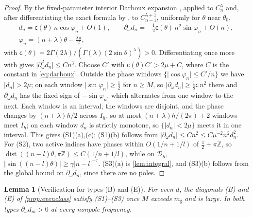 \documentclass[11pt]{amsart}
\numberwithin{equation}{section}
\newtheorem{lemma}[theorem]{Lemma}
\theoremstyle{definition}
\theoremstyle{remark}
\newcommand{\Z}{\mathbb{Z}}
\newcommand{\abs}[1]{\lvert #1\rvert}
\newcommand{\dist}{\operatorname{dist}}
\newcommand{\Dh}{\mathcal D_h}
\begin{document}
\begin{proof}
By the fixed-parameter interior Darboux expansion \cite[(18.15.4\_5) and \S18.15(ii)]{DLMF}, applied to $C^\lambda_n$ and, after differentiating the exact formula by \cite[(18.9.19)]{DLMF}, to $C^{\lambda+1}_{n-1}$, uniformly for $\theta$ near $\theta_0$,
\begin{equation}\label{eq:darboux}
\begin{gathered}
d_n=\mathsf c(\theta)\,n\cos\varphi_n+O(1),\qquad \partial_\omega d_n=-\tfrac12\mathsf c(\theta)\,n^2\sin\varphi_n+O(n),\\
\varphi_n=(n+\lambda)\theta-\tfrac{\lambda\pi}2,
\end{gathered}
\end{equation}
with $\mathsf c(\theta)=2\Gamma(2\lambda)/(\Gamma(\lambda)(2\sin\theta)^\lambda)>0$. Differentiating once more with \cite[(18.9.19)]{DLMF} gives $\abs{\partial^2_\omega d_n}\le Cn^3$. Choose $C'$ with $\mathsf c(\theta)C'>2\mu+C$, where $C$ is the constant in \eqref{eq:darboux}. Outside the phase windows $\{\abs{\cos\varphi_n}\le C'/n\}$ we have $\abs{d_n}>2\mu$; on each window $\abs{\sin\varphi_n}\ge\frac12$ for $n\ge M$, so $\abs{\partial_\omega d_n}\ge\frac18\mathsf c\,n^2$ there and $\partial_\omega d_n$ has the fixed sign of $-\sin\varphi_n$, which alternates from one window to the next. Each window is an interval, the windows are disjoint, and the phase changes by $(n+\lambda)h/2$ across $I_h$, so at most $(n+\lambda)h/(2\pi)+2$ windows meet $I_h$; on each window $d_n$ is strictly monotone, so $\{\abs{d_n}<2\mu\}$ meets it in one interval. This gives (S1)(a),(c); (S1)(b) follows from $\abs{\partial_\omega d_n}\le Cn^2\le C\mu^{-2}n^2d_n^2$. For (S2), two active indices have phases within $O(1/n+1/l)$ of $\frac\pi2+\pi\Z$, so $\dist((n-l)\theta,\pi\Z)\le C(1/n+1/l)$, while on $\Dh$, $\abs{\sin((n-l)\theta)}\ge\gamma\abs{n-l}^{-\tau}$. (S3)(a) is \cref{lem:integral}, and (S3)(b) follows from the global bound on $\partial_\omega d_n$, since there are no poles.
\end{proof}

\begin{lemma}[Verification for types (B) and (E)]\label{lem:verifyBE}
For even $d$, the diagonals \textup{(B)} and \textup{(E)} of \cref{prop:evenclass} satisfy \textup{(S1)--(S3)} once $M$ exceeds $m_\sharp$ and is large. In both types $\partial_\omega d_m>0$ at every nonpole frequency.
\end{lemma}
\end{document}
